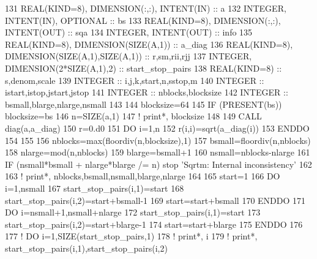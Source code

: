 \begin{DoxyCode}
131     \textcolor{keywordtype}{REAL(KIND=8)}, \textcolor{keywordtype}{DIMENSION(:,:)}, \textcolor{keywordtype}{INTENT(IN)} :: a
132     \textcolor{keywordtype}{INTEGER}, \textcolor{keywordtype}{INTENT(IN)}, \textcolor{keywordtype}{OPTIONAL} :: bs
133     \textcolor{keywordtype}{REAL(KIND=8)}, \textcolor{keywordtype}{DIMENSION(:,:)}, \textcolor{keywordtype}{INTENT(OUT)} :: sqa
134     \textcolor{keywordtype}{INTEGER}, \textcolor{keywordtype}{INTENT(OUT)} :: info
135     \textcolor{keywordtype}{REAL(KIND=8)}, \textcolor{keywordtype}{DIMENSION(SIZE(A,1))} :: a\_diag
136     \textcolor{keywordtype}{REAL(KIND=8)}, \textcolor{keywordtype}{DIMENSION(SIZE(A,1),SIZE(A,1))} :: r,sm,rii,rjj
137     \textcolor{keywordtype}{INTEGER}, \textcolor{keywordtype}{DIMENSION(2*SIZE(A,1),2)} :: start\_stop\_pairs
138     \textcolor{keywordtype}{REAL(KIND=8)} :: s,denom,scale
139     \textcolor{keywordtype}{INTEGER} :: i,j,k,start,n,sstop,m
140     \textcolor{keywordtype}{INTEGER} :: istart,istop,jstart,jstop
141     \textcolor{keywordtype}{INTEGER} :: nblocks,blocksize
142     \textcolor{keywordtype}{INTEGER} :: bsmall,blarge,nlarge,nsmall
143 
144     blocksize=64
145     \textcolor{keywordflow}{IF} (\textcolor{keyword}{PRESENT}(bs)) blocksize=bs
146     n=\textcolor{keyword}{SIZE}(a,1)
147     \textcolor{comment}{! print*,  blocksize}
148 
149     \textcolor{keyword}{CALL }diag(a,a\_diag)
150     r=0.d0
151     \textcolor{keywordflow}{DO} i=1,n
152        r(i,i)=sqrt(a\_diag(i))
153 \textcolor{keywordflow}{    ENDDO}
154     
155 
156     nblocks=max(floordiv(n,blocksize),1)
157     bsmall=floordiv(n,nblocks)
158     nlarge=mod(n,nblocks)
159     blarge=bsmall+1
160     nsmall=nblocks-nlarge
161     \textcolor{keywordflow}{IF} (nsmall*bsmall + nlarge*blarge /= n) stop \textcolor{stringliteral}{'Sqrtm: Internal inconsistency'}
162 
163     \textcolor{comment}{! print*, nblocks,bsmall,nsmall,blarge,nlarge}
164 
165     start=1
166     \textcolor{keywordflow}{DO} i=1,nsmall
167        start\_stop\_pairs(i,1)=start
168        start\_stop\_pairs(i,2)=start+bsmall-1
169        start=start+bsmall
170 \textcolor{keywordflow}{    ENDDO}
171     \textcolor{keywordflow}{DO} i=nsmall+1,nsmall+nlarge
172        start\_stop\_pairs(i,1)=start
173        start\_stop\_pairs(i,2)=start+blarge-1
174        start=start+blarge
175 \textcolor{keywordflow}{    ENDDO}
176     
177     \textcolor{comment}{! DO i=1,SIZE(start\_stop\_pairs,1)}
178     \textcolor{comment}{!    print*, i}
179     \textcolor{comment}{!    print*, start\_stop\_pairs(i,1),start\_stop\_pairs(i,2)}

\end{DoxyCode}
